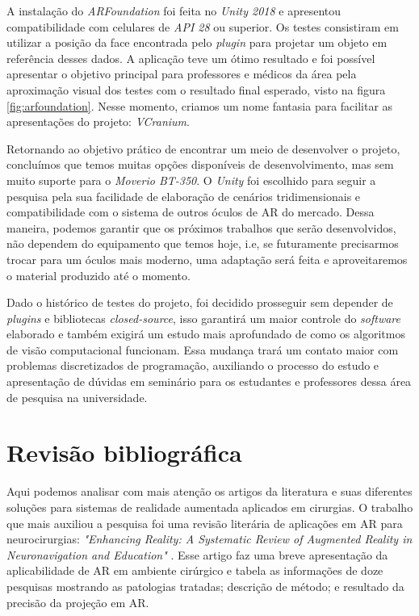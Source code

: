 A instalação do \textit{ARFoundation} foi feita no \textit{Unity 2018} e apresentou compatibilidade com celulares de \textit{API 28} ou superior. Os testes consistiram em utilizar a posição da face encontrada pelo \textit{plugin} para projetar um objeto em referência desses dados. A aplicação teve um ótimo resultado e foi possível apresentar o objetivo principal para professores e médicos da área pela aproximação visual dos testes com o resultado final esperado, visto na figura \ref{fig:arfoundation}. Nesse momento, criamos um nome fantasia para facilitar as apresentações do projeto: \textit{VCranium}.

Retornando ao objetivo prático de encontrar um meio de desenvolver o projeto, concluímos que temos muitas opções disponíveis de desenvolvimento, mas sem muito suporte para o \textit{Moverio BT-350}. O \textit{Unity} foi escolhido para seguir a pesquisa pela sua facilidade de elaboração de cenários tridimensionais e compatibilidade com o sistema de outros óculos de AR do mercado. Dessa maneira, podemos garantir que os próximos trabalhos que serão desenvolvidos, não dependem do equipamento que temos hoje, i.e, se futuramente precisarmos trocar para um óculos mais moderno, uma adaptação será feita e aproveitaremos o material produzido até o momento.

Dado o histórico de testes do projeto, foi decidido prosseguir sem depender de \textit{plugins} e bibliotecas \textit{closed-source}, isso garantirá um maior controle do \textit{software} elaborado e também exigirá um estudo mais aprofundado de como os algoritmos de visão computacional funcionam. Essa mudança trará um contato maior com problemas discretizados de programação, auxiliando o processo do estudo e apresentação de dúvidas em seminário para os estudantes e professores dessa área de pesquisa na universidade.

\section{Revisão bibliográfica}

Aqui podemos analisar com mais atenção os artigos da literatura e suas diferentes soluções para sistemas de realidade aumentada aplicados em cirurgias. O trabalho que mais auxiliou a pesquisa foi uma revisão literária de aplicações em AR para neurocirurgias: \textit{"Enhancing Reality: A Systematic Review of Augmented Reality in Neuronavigation and Education"} \cite{enhancedvision}. Esse artigo faz uma breve apresentação da aplicabilidade de AR em ambiente cirúrgico e tabela as informações de doze pesquisas mostrando as patologias tratadas; descrição de método; e resultado da precisão da projeção em AR.

